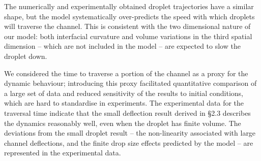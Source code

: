 The numerically and experimentally obtained droplet trajectories have a similar shape, but the model systematically over-predicts the speed with which droplets will traverse the channel. This is consistent with the two dimensional nature of our model: both interfacial curvature and volume variations in the third spatial dimension -- which are not included in the model -- are expected to slow the droplet down.

We considered the time to traverse a portion of the channel as a proxy for the dynamic behaviour; introducing this proxy facilitated quantitative comparison of a large set of data and reduced sensitivity of the results to initial conditions, which are hard to standardise in experiments. The experimental data for the traversal time indicate that the small deflection result derived in \S2.3 describes the dynamics reasonably well, even when the droplet has finite volume. The deviations from the small droplet result -- the non-linearity associated with large channel deflections, and the finite drop size effects predicted by the model -- are represented in the experimental data.


